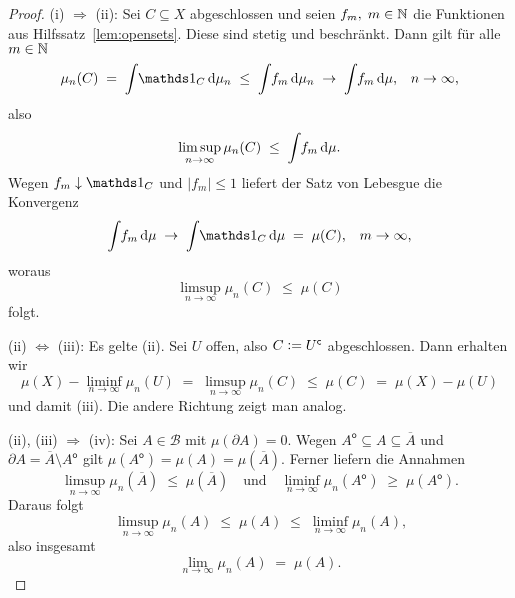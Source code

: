 \documentclass[../main/main.tex]{subfiles}
\begin{document}
	\begin{proof}
		(i) $\Rightarrow$ (ii): Sei $C \subseteq X$ abgeschlossen und seien 
		$f_m, \; m \in \mathbb{N}$ die Funktionen aus Hilfssatz~\ref{lem:opensets}. 
		Diese sind stetig und beschränkt.
		Dann gilt für alle $m \in \mathbb{N}$
		$$\mu_n(C) \; = \; \measureint{}{\indfct_C}{\mu_n} \; \leq \; 
			\measureint{}{f_m}{\mu_n} \; \to \;
			\measureint{}{f_m}{\mu} \text{,} \quad n \to \infty \text{,}$$
		also 
		$$\limsup_{n \to \infty} \mu_n(C) \; \leq \; 
			\int_{} \, f_m \, \mathrm{d}\mu \text{.}$$
		Wegen $f_m \convdown \indfct_C$ und $| f_m | \leq 1$ 
		liefert der Satz von Lebesgue die Konvergenz
		$$\measureint{}{f_m}{\mu} \; \to \;
			\measureint{}{\indfct_C}{\mu} \; = \; \mu(C) \text{,} 
			\quad m \to \infty \text{,}$$
		woraus
		$$\limsup_{n \to \infty} \mu_n(C) \; \leq \; \mu(C)$$
		folgt.
		
		(ii) $\Leftrightarrow$ (iii): Es gelte (ii). Sei $U$ offen, also 
		$C \vcentcolon = U^\mathsf{c}$ abgeschlossen. Dann erhalten wir
		$$\mu(X) - \liminf_{n \to \infty} \mu_n(U) \; = \; 
			\limsup_{n \to \infty} \mu_n(C) \; \leq \; 
			\mu(C) \; = \; \mu(X) - \mu(U)$$
		und damit (iii). Die andere Richtung zeigt man analog.
		
		(ii), (iii) $\Rightarrow$ (iv): Sei $A \in \mathcal{B}$ mit 
		$\mu(\partial A) = 0$. Wegen
		$A^\mathsf{o} \subseteq A \subseteq \overline{A}$ und 
			$\partial A = \overline{A} \setminus A^\mathsf{o}$ gilt $\mu(A^\mathsf{o}) = 
			\mu(A) = \mu(\overline{A}) \text{.}$
		Ferner liefern die Annahmen
		$$\limsup_{n \to \infty} \mu_n(\overline{A}) \; \leq \; 
			\mu(\overline{A}) \quad \text{und} \quad 
			\liminf_{n \to \infty} \mu_n(A^\mathsf{o}) \; \geq \; 
			\mu(A^\mathsf{o}) \text{.}$$
		Daraus folgt
		$$\limsup_{n \to \infty} \mu_n(A) \; \leq \; 
		\mu(A) \; \leq \; \liminf_{n \to \infty} \mu_n(A) \text{,}$$
		also insgesamt
		$$\lim_{n \to \infty} \mu_n(A) \; = \; \mu(A) \text{.}$$
		

\end{proof}
\end{document}
